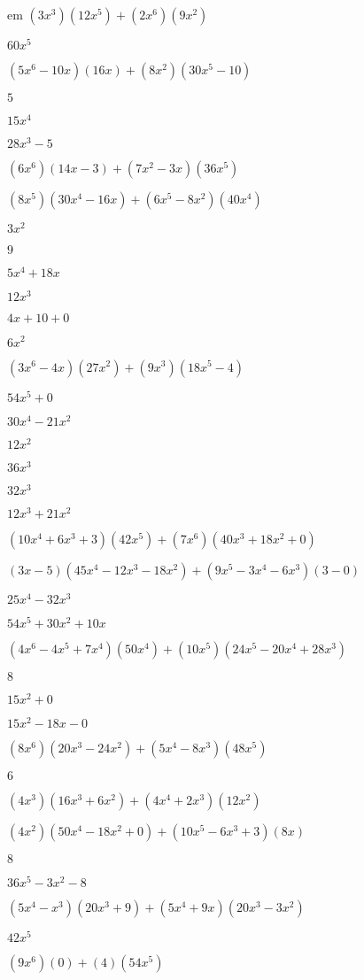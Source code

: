 \documentclass{article}
\begin{document}
\begin{multicols}{2}
em $(3x^{3})(12x^{5})+(2x^{6})(9x^{2})$\item $60x^{5}$\item $(5x^{6}-10x)(16x)+(8x^2)(30x^{5}-10)$\item $5$\item $15x^{4}$\item $28x^{3}-5$\item $(6x^{6})(14x-3)+(7x^2-3x)(36x^{5})$\item $(8x^{5})(30x^{4}-16x)+(6x^{5}-8x^2)(40x^{4})$\item $3x^{2}$\item $9$\item $5x^{4}+18x$\item $12x^{3}$\item $4x+10+0$\item $6x^{2}$\item $(3x^{6}-4x)(27x^{2})+(9x^{3})(18x^{5}-4)$\item $54x^{5}+0$\item $30x^{4}-21x^{2}$\item $12x^{2}$\item $36x^{3}$\item $32x^{3}$\item $12x^{3}+21x^{2}$\item $(10x^{4}+6x^{3}+3)(42x^{5})+(7x^{6})(40x^{3}+18x^{2}+0)$\item $(3x-5)(45x^{4}-12x^{3}-18x^{2})+(9x^{5}-3x^{4}-6x^{3})(3-0)$\item $25x^{4}-32x^{3}$\item $54x^{5}+30x^{2}+10x$\item $(4x^{6}-4x^{5}+7x^{4})(50x^{4})+(10x^{5})(24x^{5}-20x^{4}+28x^{3})$\item $8$\item $15x^{2}+0$\item $15x^{2}-18x-0$\item $(8x^{6})(20x^{3}-24x^{2})+(5x^{4}-8x^{3})(48x^{5})$\item $6$\item $(4x^{3})(16x^{3}+6x^{2})+(4x^{4}+2x^{3})(12x^{2})$\item $(4x^2)(50x^{4}-18x^{2}+0)+(10x^{5}-6x^{3}+3)(8x)$\item $8$\item $36x^{5}-3x^{2}-8$\item $(5x^{4}-x^{3})(20x^{3}+9)+(5x^{4}+9x)(20x^{3}-3x^{2})$\item $42x^{5}$\item $(9x^{6})(0)+(4)(54x^{5})$\item 
\end{multicols}
\end{document}
